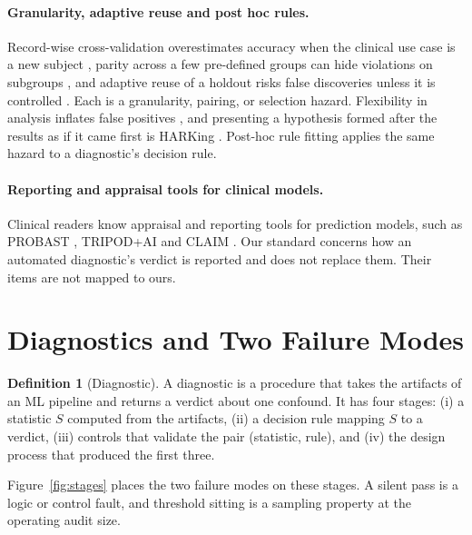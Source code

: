 \documentclass[10pt]{article}
\theoremstyle{definition}
\newtheorem{definition}{Definition}
\begin{document}
\paragraph{Granularity, adaptive reuse and post hoc rules.} Record-wise cross-validation overestimates accuracy when the clinical use case is a new subject \citep{saeb2017usecase}, parity across a few pre-defined groups can hide violations on subgroups \citep{kearns2018gerrymandering}, and adaptive reuse of a holdout risks false discoveries unless it is controlled \citep{dwork2015reusable}. Each is a granularity, pairing, or selection hazard. Flexibility in analysis inflates false positives \citep{simmons2011falsepositive}, and presenting a hypothesis formed after the results as if it came first is HARKing \citep{kerr1998harking}. Post-hoc rule fitting applies the same hazard to a diagnostic's decision rule.

\paragraph{Reporting and appraisal tools for clinical models.} Clinical readers know appraisal and reporting tools for prediction models, such as PROBAST \citep{wolff2019probast}, TRIPOD+AI \citep{collins2024tripodai} and CLAIM \citep{mongan2020claim}. Our standard concerns how an automated diagnostic's verdict is reported and does not replace them. Their items are not mapped to ours.

\section{Diagnostics and Two Failure Modes}
\label{sec:setup}

\begin{definition}[Diagnostic]
A diagnostic is a procedure that takes the artifacts of an ML pipeline and returns a verdict about one confound. It has four stages: (i) a statistic $S$ computed from the artifacts, (ii) a decision rule mapping $S$ to a verdict, (iii) controls that validate the pair (statistic, rule), and (iv) the design process that produced the first three.
\end{definition}

Figure~\ref{fig:stages} places the two failure modes on these stages. A silent pass is a logic or control fault, and threshold sitting is a sampling property at the operating audit size.
\end{document}
